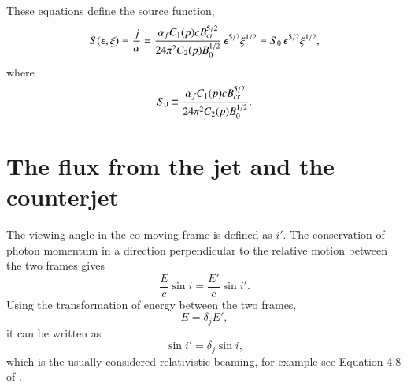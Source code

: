 These equations define the source function,
\begin{equation}
S(\epsilon, \xi) \equiv \frac{j}{\alpha} = \dfrac{\alpha_f C_1(p) c B_{cr}^{5/2}}{24 \pi^2 C_2(p) B_0^{1/2}} \, \epsilon^{5/2} \xi^{1/2} \equiv S_0 \, \epsilon^{5/2} \xi^{1/2} ,
\label{eq:source_function}
\end{equation} where
\begin{equation}
S_0 \equiv \dfrac{\alpha_f C_1(p) c B_{cr}^{5/2}}{24 \pi^2 C_2(p) B_0^{1/2}}.
\label{eq:Szero}
\end{equation}



\section{The flux from the jet and the counterjet}
\label{sec:flux_calculation}
The viewing angle in the co-moving frame is defined as $i'$. The conservation of photon momentum in a direction perpendicular to the relative motion between the two frames gives
\begin{equation}
\frac{E}{c} \sin i = \frac{E'}{c} \sin i'.
\end{equation}
Using the transformation of energy between the two frames,
\begin{equation}
E = \delta_j E',
\end{equation}
it can be written as
\begin{equation}
\sin i' = \delta_j \sin i,
\end{equation}
which is the usually considered relativistic beaming, for example see Equation 4.8 of .


